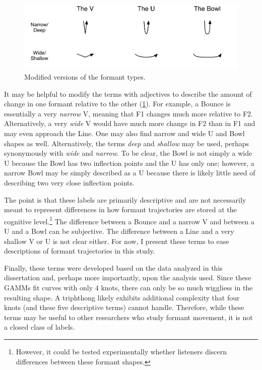 \begin{figure}[tb!]
    \centering
    \includegraphics[width = 6.5in]{Figures/other_figures/traj_shapes_mod.pdf}
    \caption{Modified versions of the formant types.}
    \label{fig:curve_types_mod}
\end{figure}

It may be helpful to modify the terms with adjectives to describe the amount of change in one formant relative to the other (\ref{fig:curve_types_mod}). For example, a Bounce is essentially a very \textit{narrow} V, meaning that F1 changes much more relative to F2. Alternatively, a very \textit{wide} V would have much more change in F2 than in F1 and may even approach the Line. One may also find narrow and wide U and Bowl shapes as well. Alternatively, the terms \textit{deep} and \textit{shallow} may be used, perhaps synonymously with \textit{wide} and \textit{narrow}. To be clear, the Bowl is not simply a wide U because the Bowl has two inflection points and the U has only one; however, a narrow Bowl may be simply described as a U because there is likely little need of describing two very close inflection points.

The point is that these labels are primarily descriptive and are not necessarily meant to represent differences in how formant trajectories are stored at the cognitive level.\footnote{However, it could be tested experimentally whether listeners discern differences between these formant shapes.} The difference between a Bounce and a narrow V and between a U and a Bowl can be subjective. The difference between a Line and a very shallow V or U is not clear either. For now, I present these terms to ease descriptions of formant trajectories in this study.

Finally, these terms were developed based on the data analyzed in this dissertation and, perhaps more importantly, upon the analysis used. Since these GAMMs fit curves with only 4 knots, there can only be so much wiggliess in the resulting shape. A triphthong likely exhibits additional complexity that four knots (and these five descriptive terms) cannot handle. Therefore, while these terms may be useful to other researchers who study formant movement, it is not a closed class of labels.







